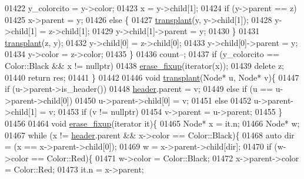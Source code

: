 \begin{DoxyCode}
01422             y\_colorcito = y->color;
01423             x = y->child[1];
01424             \textcolor{keywordflow}{if} (y->parent == z)
01425                 x->parent = y;
01426             \textcolor{keywordflow}{else} \{
01427                 \hyperlink{classaed2_1_1map_a98b9f200c64ce02dfb67902ee00e375a_a98b9f200c64ce02dfb67902ee00e375a}{transplant}(y, y->child[1]);
01428                 y->child[1] = z->child[1];
01429                 y->child[1]->parent = y;
01430             \}
01431             \hyperlink{classaed2_1_1map_a98b9f200c64ce02dfb67902ee00e375a_a98b9f200c64ce02dfb67902ee00e375a}{transplant}(z, y);
01432             y->child[0] = z->child[0];
01433             y->child[0]->parent = y;
01434             y->color = z->color;
01435         \}
01436         count--;
01437         \textcolor{keywordflow}{if} (y\_colorcito == Color::Black && x != \textcolor{keyword}{nullptr})
01438             \hyperlink{classaed2_1_1map_a7870c8f26e82b00d0aeb2e9f331dfec6_a7870c8f26e82b00d0aeb2e9f331dfec6}{erase_fixup}(iterator(x));
01439         \textcolor{keyword}{delete} z;
01440         \textcolor{keywordflow}{return} res;
01441     \}
01442 
01446     \textcolor{keywordtype}{void} \hyperlink{classaed2_1_1map_a98b9f200c64ce02dfb67902ee00e375a_a98b9f200c64ce02dfb67902ee00e375a}{transplant}(Node* u, Node* v)\{
01447         \textcolor{keywordflow}{if} (u->parent->is\_header())
01448             \hyperlink{classaed2_1_1map_a92d93f905c8ad73fba18fdc7e8915cce_a92d93f905c8ad73fba18fdc7e8915cce}{header}.parent = v;
01449         \textcolor{keywordflow}{else} if (u == u->parent->child[0])
01450             u->parent->child[0] = v;
01451         \textcolor{keywordflow}{else}
01452             u->parent->child[1] = v;
01453         \textcolor{keywordflow}{if} (v != \textcolor{keyword}{nullptr})
01454             v->parent = u->parent;
01455     \}
01456 
01464     \textcolor{keywordtype}{void} \hyperlink{classaed2_1_1map_a7870c8f26e82b00d0aeb2e9f331dfec6_a7870c8f26e82b00d0aeb2e9f331dfec6}{erase_fixup}(iterator it)\{
01465         Node* x = it.n;
01466         Node* w;
01467         \textcolor{keywordflow}{while} (x != \hyperlink{classaed2_1_1map_a92d93f905c8ad73fba18fdc7e8915cce_a92d93f905c8ad73fba18fdc7e8915cce}{header}.parent && x->color == Color::Black)\{
01468             \textcolor{keyword}{auto} dir = (x == x->parent->child[0]);
01469             w = x->parent->child[dir];
01470             \textcolor{keywordflow}{if} (w->color == Color::Red)\{
01471                 w->color = Color::Black;
01472                 x->parent->color = Color::Red;
01473                 it.n = x->parent;

\end{DoxyCode}
